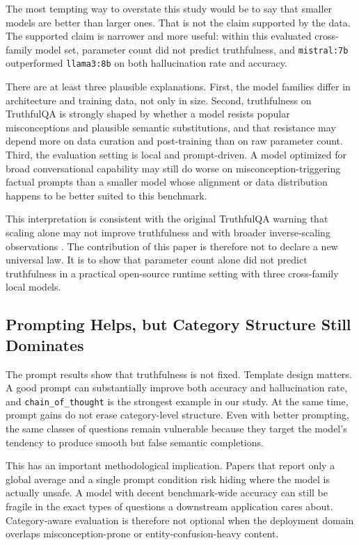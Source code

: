\documentclass[conference]{IEEEtran}
\begin{document}
The most tempting way to overstate this study would be to say that smaller models are better than larger ones. That is not the claim supported by the data. The supported claim is narrower and more useful: within this evaluated cross-family model set, parameter count did not predict truthfulness, and \texttt{mistral:7b} outperformed \texttt{llama3:8b} on both hallucination rate and accuracy.

There are at least three plausible explanations. First, the model families differ in architecture and training data, not only in size. Second, truthfulness on TruthfulQA is strongly shaped by whether a model resists popular misconceptions and plausible semantic substitutions, and that resistance may depend more on data curation and post-training than on raw parameter count. Third, the evaluation setting is local and prompt-driven. A model optimized for broad conversational capability may still do worse on misconception-triggering factual prompts than a smaller model whose alignment or data distribution happens to be better suited to this benchmark.

This interpretation is consistent with the original TruthfulQA warning that scaling alone may not improve truthfulness \cite{truthfulqa} and with broader inverse-scaling observations \cite{inverse_scaling}. The contribution of this paper is therefore not to declare a new universal law. It is to show that parameter count alone did not predict truthfulness in a practical open-source runtime setting with three cross-family local models.

\subsection{\textbf{Prompting Helps, but Category Structure Still Dominates}}

The prompt results show that truthfulness is not fixed. Template design matters. A good prompt can substantially improve both accuracy and hallucination rate, and \texttt{chain\_of\_thought} is the strongest example in our study. At the same time, prompt gains do not erase category-level structure. Even with better prompting, the same classes of questions remain vulnerable because they target the model's tendency to produce smooth but false semantic completions.

This has an important methodological implication. Papers that report only a global average and a single prompt condition risk hiding where the model is actually unsafe. A model with decent benchmark-wide accuracy can still be fragile in the exact types of questions a downstream application cares about. Category-aware evaluation is therefore not optional when the deployment domain overlaps misconception-prone or entity-confusion-heavy content.
\end{document}
